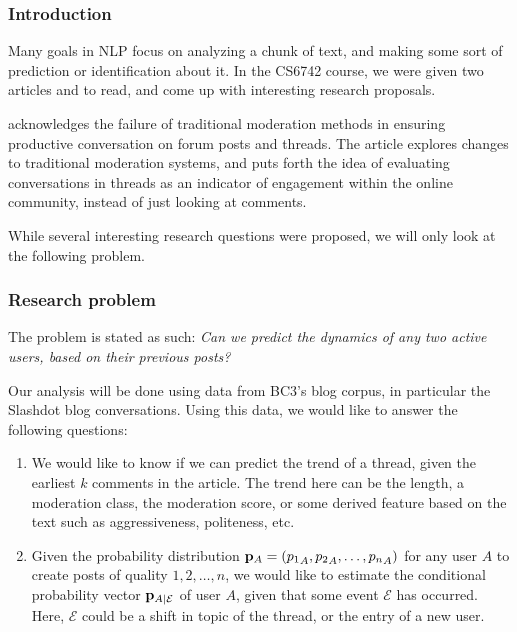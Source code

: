 \documentclass[a4paper,12pt]{article}
\numberwithin{equation}{section}
\begin{document}
 

\subsubsection*{Introduction}

% 


Many goals in NLP focus on analyzing a chunk of text, and making some sort of prediction or identification about it. In the CS6742 course, we were given two articles \cite{dejareview} and \cite{anae} to read, and come up with interesting research proposals. 

\cite{anae} acknowledges the failure of traditional moderation methods in ensuring productive conversation on forum posts and threads. The article explores changes to traditional moderation systems, and puts forth the idea of evaluating conversations in threads as an indicator of engagement within the online community, instead of just looking at comments.

While several interesting research questions were proposed, we will only look at the following problem.

\subsubsection*{Research problem}

The problem is stated as such: {\it Can we predict the dynamics of any two active users, based on their previous posts?}

Our analysis will be done using data from BC3's blog corpus, in particular the Slashdot blog conversations. Using this data, we would like to answer the following questions:
\vspace*{-0.5cm}
\begin{enumerate}
\item We would like to know if we can predict the trend of a thread, given the earliest $k$ comments in the article. The trend here can be the length, a moderation class, the moderation score, or some derived feature based on the text such as aggressiveness, politeness, etc. 
\item Given the probability distribution ${\bf p}_A = ({p_1}_A, {p_2}_A,\hdots, {p_n}_A)$ for any user $A$ to create posts of quality $1,2,\hdots, n$, we would like to estimate the conditional probability vector ${\bf p}_{A|\mathcal E}$ of user $A$, given that some event $\mathcal E$ has occurred. Here, $\mathcal E$ could be a shift in topic of the thread, or the entry of a new user.
\end{enumerate}
\end{document}
